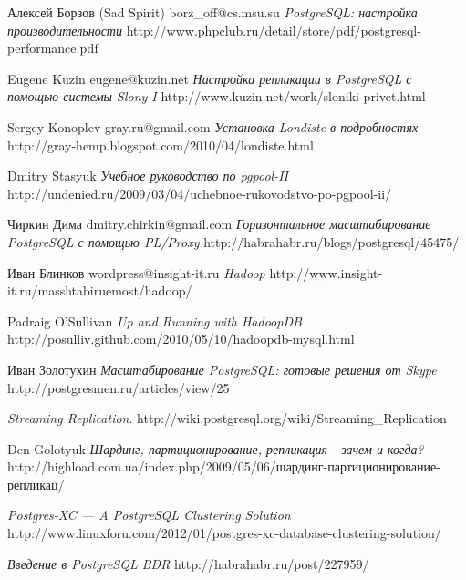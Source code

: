 \renewcommand\bibname{Литература}

\begin{thebibliography}{9}

  Алексей Борзов (Sad Spirit) borz\_off@cs.msu.su
  \emph{PostgreSQL: настройка производительности}
  http://www.phpclub.ru/detail/store/pdf/postgresql-performance.pdf

  Eugene Kuzin eugene@kuzin.net
  \emph{Настройка репликации в PostgreSQL с помощью системы Slony-I}
  http://www.kuzin.net/work/sloniki-privet.html

  Sergey Konoplev gray.ru@gmail.com
  \emph{Установка Londiste в подробностях}
  http://gray-hemp.blogspot.com/2010/04/londiste.html

  Dmitry Stasyuk
  \emph{Учебное руководство по pgpool-II}
  http://undenied.ru/2009/03/04/uchebnoe-rukovodstvo-po-pgpool-ii/

  Чиркин Дима dmitry.chirkin@gmail.com
  \emph{Горизонтальное масштабирование PostgreSQL с помощью PL/Proxy}
  http://habrahabr.ru/blogs/postgresql/45475/

  Иван Блинков wordpress@insight-it.ru
  \emph{Hadoop}
  http://www.insight-it.ru/masshtabiruemost/hadoop/

  Padraig O'Sullivan
  \emph{Up and Running with HadoopDB}
  http://posulliv.github.com/2010/05/10/hadoopdb-mysql.html

  Иван Золотухин
  \emph{Масштабирование PostgreSQL: готовые решения от Skype}
  http://postgresmen.ru/articles/view/25

  \emph{Streaming Replication}.
  http://wiki.postgresql.org/wiki/Streaming\_Replication

  Den Golotyuk
  \emph{Шардинг, партиционирование, репликация - зачем и когда?}
  http://highload.com.ua/index.php/2009/05/06/шардинг-партиционирование-репликац/

  \emph{Postgres-XC — A PostgreSQL Clustering Solution}
  http://www.linuxforu.com/2012/01/postgres-xc-database-clustering-solution/

  \emph{Введение в PostgreSQL BDR}
  http://habrahabr.ru/post/227959/

\end{thebibliography}